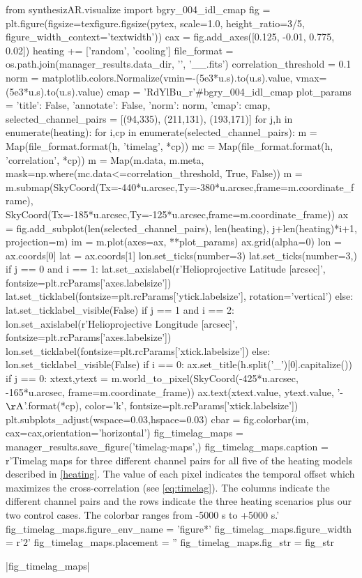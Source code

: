 \begin{pycode}
from synthesizAR.visualize import bgry_004_idl_cmap
fig = plt.figure(figsize=texfigure.figsize(pytex, scale=1.0, height_ratio=3/5,
                                           figure_width_context='textwidth'))
cax = fig.add_axes([0.125, -0.01, 0.775, 0.02])
heating += ['random', 'cooling']
file_format = os.path.join(manager_results.data_dir, '{}', '{}_{}_{}.fits')
correlation_threshold = 0.1
norm = matplotlib.colors.Normalize(vmin=-(5e3*u.s).to(u.s).value,
                                   vmax=(5e3*u.s).to(u.s).value)
cmap = 'RdYlBu_r'#bgry_004_idl_cmap
plot_params = {'title': False, 'annotate': False, 'norm': norm, 'cmap': cmap,}
selected_channel_pairs = [(94,335), (211,131), (193,171)]
for j,h in enumerate(heating):
    for i,cp in enumerate(selected_channel_pairs):
        m = Map(file_format.format(h, 'timelag', *cp))
        mc = Map(file_format.format(h, 'correlation', *cp))
        m = Map(m.data, m.meta, mask=np.where(mc.data<=correlation_threshold, True, False))
        m = m.submap(SkyCoord(Tx=-440*u.arcsec,Ty=-380*u.arcsec,frame=m.coordinate_frame),
                     SkyCoord(Tx=-185*u.arcsec,Ty=-125*u.arcsec,frame=m.coordinate_frame))
        ax = fig.add_subplot(len(selected_channel_pairs), len(heating), j+len(heating)*i+1,
                             projection=m)
        im = m.plot(axes=ax, **plot_params)
        ax.grid(alpha=0)
        lon = ax.coords[0]
        lat = ax.coords[1]
        lon.set_ticks(number=3)
        lat.set_ticks(number=3,) 
        if j == 0 and i == 1:
            lat.set_axislabel(r'Helioprojective Latitude [arcsec]', fontsize=plt.rcParams['axes.labelsize'])
            lat.set_ticklabel(fontsize=plt.rcParams['ytick.labelsize'], rotation='vertical')
        else:
            lat.set_ticklabel_visible(False)
        if j == 1 and i == 2:
            lon.set_axislabel(r'Helioprojective Longitude [arcsec]', fontsize=plt.rcParams['axes.labelsize'])
            lon.set_ticklabel(fontsize=plt.rcParams['xtick.labelsize'])
        else:
            lon.set_ticklabel_visible(False)
        if i == 0:
            ax.set_title(h.split('_')[0].capitalize())
        if j == 0:
            xtext,ytext = m.world_to_pixel(SkyCoord(-425*u.arcsec, -165*u.arcsec, frame=m.coordinate_frame))
            ax.text(xtext.value, ytext.value, '{}-{} $\mathrm{{\AA}}$'.format(*cp),
                    color='k', fontsize=plt.rcParams['xtick.labelsize'])
plt.subplots_adjust(wspace=0.03,hspace=0.03)
cbar = fig.colorbar(im, cax=cax,orientation='horizontal')
fig_timelag_maps = manager_results.save_figure('timelag-maps',)
fig_timelag_maps.caption = r'Timelag maps for three different channel pairs for all five of the heating models described in \autoref{heating}. The value of each pixel indicates the temporal offset which maximizes the cross-correlation (see \autoref{eq:timelag}). The columns indicate the different channel pairs and the rows indicate the three heating scenarios plus our two control cases. The colorbar ranges from -5000 s to +5000 s.'
fig_timelag_maps.figure_env_name = 'figure*'
fig_timelag_maps.figure_width = r'2\columnwidth'
fig_timelag_maps.placement = ''
fig_timelag_maps.fig_str = fig_str
\end{pycode}
|fig_timelag_maps|

